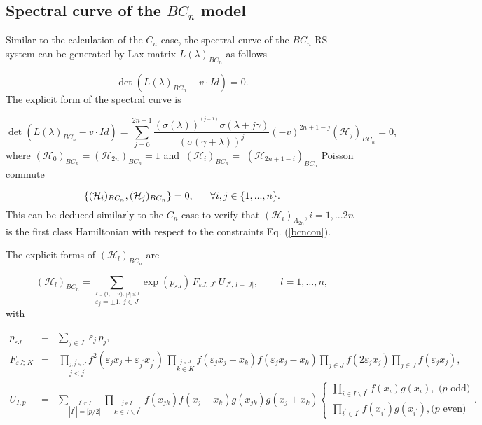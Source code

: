 \documentclass[a4paper,12pt]{article}
\begin{document}
\subsection{Spectral curve of the $BC_{n}$ model}

Similar to the calculation of the $C_n$ case, the spectral curve
of the $BC_{n}$ RS system can be generated by Lax matrix $
L(\lambda)_{BC_{n}} $ as follows

\begin{equation}
\det (L(\lambda )_{BC_{n}}-v\cdot Id)=0.
\end{equation}
The explicit form of the spectral curve is

\[
\det (L(\lambda )_{BC_{n}}-v\cdot Id)=\sum_{j=0}^{2n+1}\frac{(\sigma
(\lambda ))^{^{(j-1)}}\sigma (\lambda +j\gamma )}{(\sigma
(\gamma +\lambda
))^{j}}(-v)^{2n+1-j}(\mathcal{H}_{j})_{BC_{n}}=0,
\]
where
$(\mathcal{H}_{0})_{BC_{n}}=(\mathcal{H}_{2n})_{BC_{n}}=1$
and $\ (
\mathcal{H}_{i})_{BC_{n}}=$ $(\mathcal{H}_{2n+1-i})_{BC_{n}}$ Poisson commute

\begin{equation}
\{(\mathcal{H}_{i})_{BC_{n}},(\mathcal{H}_{j})_{BC_{n}}\}=0,
\mbox{$ \ \ \ \ \
$}\forall i,j\in \{1,...,n\}.
\end{equation}
This can be deduced similarly to the $C_{n}$ case to verify
that $(\mathcal{H}_{i})_{A_{2n}},i=1,...2n$ is the first
class  Hamiltonian with respect to the constraints Eq.
(\ref{bcncon}).

The explicit forms of $(\mathcal{H}_{l})_{BC_{n}}$ are


\begin{equation}
(\mathcal{H}_{l})_{BC_{n}}=\sum_{\stackrel{J\subset
\{1,\ldots ,n\},\,|J|\leq l}{\varepsilon _{j}=\pm 1,\,j\in
J}}\mathrm{\exp } (p_{\varepsilon J})\,F_{\varepsilon
J;\,J^{c}}\,U_{J^{c},\,l-|J|},\;\;\;\;\;\;\;\;l=1,\ldots ,n,
\end{equation}
with

\begin{eqnarray}
p_{\varepsilon J} &=&\sum_{j\in J}\;\varepsilon _{j}\,p_{j},
\nonumber \\ F_{\varepsilon J;\,K}
&=&\,\prod_{\stackrel{j,j^{\prime }\in J}{j<j^{\prime }
}}f^{2}(\varepsilon _{j}x_{j}+\varepsilon _{j^{\prime
}}x_{j^{\prime }})\,\prod_{\stackrel{j\in J}{k\in
K}}f(\varepsilon
_{j}x_{j}+x_{k})f(\varepsilon _{j}x_{j}-x_{k})\prod_{j\in J}f(2\varepsilon
_{j}x_{j})\prod_{j\in J}f(\varepsilon _{j}x_{j}), \\
U_{I,p} &=&\sum_{\stackrel{I^{\prime }\subset I}{|I^{\prime
}|=\lbrack p/2\rbrack }}\prod_{\stackrel{j\in I^{\prime
}}{k\in I\backslash I^{\prime }}
\,}f(x_{jk})f(x_{j}+x_{k})g(x_{jk})g(x_{j}+x_{k})\left\{
\begin{array}{c}
\prod_{i\in I\backslash I^{\prime }}f(x_{i})g(x_{i}),\mbox{ \ ($p$ odd)} \\
\prod_{i^{\prime }\in I^{\prime }}f(x_{i^{\prime }})g(x_{i^{\prime }}),
\mbox{
\ \ ($p$ even)}
\end{array}
\right..\nonumber
\end{eqnarray}
\end{document}
